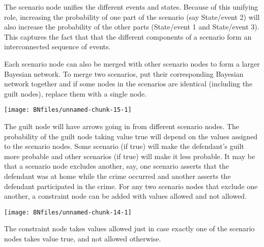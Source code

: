 \documentclass{article}
\begin{document}
\noindent
 The scenario node unifies the different events and states.  
 Because of this unifying role, increasing the probability of one part of the scenario (say \textsf{State/event 2}) will also increase the probability of the other parts (\textsf{State/event 1} and  \textsf{State/event 3}). This captures the fact that that the different components 
 of a scenario form an interconnected sequence of events. 
 
 
%
%
Each scenario node can also be merged with other scenario nodes to form a larger Bayesian network.  To merge two scenarios, put their
corresponding Bayesian network together and if some nodes in the scenarios are identical (including the guilt nodes), replace them with a single node.
%
\begin{center}\texttt{[image: BNfiles/unnamed-chunk-15-1]} \end{center}
%
The guilt node will have arrows going in from different  scenario nodes. The probability of the guilt node taking value \textsf{true} will depend on the values assigned to the scenario nodes. 
Some scenario (if true) will make the defendant's guilt more probable and other scenarios (if true) will make it less probable. 
It may be that a scenario node excludes another, say, one scenario asserts that the defendant was at home while the crime occurred and another asserts the defendant participated in the crime. For any two scenario nodes that exclude one another, a constraint node can be added with values \textsf{allowed} and \textsf{not allowed}. 
%
\begin{center}\texttt{[image: BNfiles/unnamed-chunk-14-1]} \end{center}
%
\noindent
The constraint node takes values 
\textsf{allowed} just in case exactly one of the scenario nodes takes value 
\textrm{true}, and \textsf{not allowed} otherwise.
%
\end{document}
